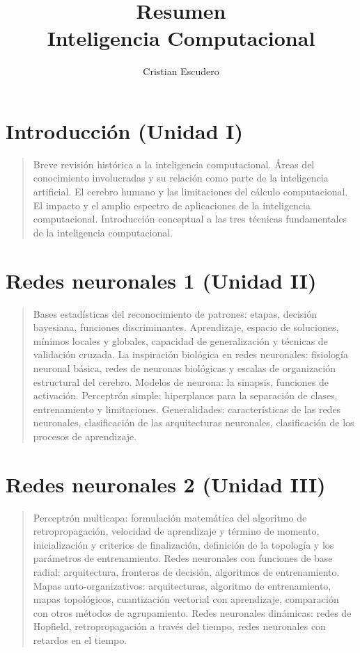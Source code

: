 \documentclass[10pt,a4paper]{article}
\author{Cristian Escudero}
\title{Resumen\\Inteligencia Computacional}
\begin{document}
\maketitle

\section*{Introducción (Unidad I)}
\begin{quote}
Breve revisión histórica a la inteligencia computacional. Áreas del conocimiento involucradas y su relación como parte de la inteligencia artificial. El cerebro humano y las limitaciones del cálculo computacional. El impacto y el amplio espectro de aplicaciones de la inteligencia computacional. Introducción conceptual a las tres técnicas fundamentales de la inteligencia computacional.
\end{quote}

\section*{Redes neuronales 1 (Unidad II)}
\begin{quote}
Bases estadísticas del reconocimiento de patrones: etapas, decisión bayesiana, funciones discriminantes. Aprendizaje, espacio de soluciones, mínimos locales y globales, capacidad de generalización y técnicas de validación cruzada. La inspiración biológica en redes neuronales: fisiología neuronal básica, redes de neuronas biológicas y escalas de organización estructural del cerebro. Modelos de neurona: la sinapsis, funciones de activación. Perceptrón simple: hiperplanos para la separación de clases, entrenamiento y limitaciones. Generalidades: características de las redes neuronales, clasificación de las arquitecturas neuronales, clasificación de los procesos de aprendizaje.
\end{quote}

\section*{Redes neuronales 2 (Unidad III)}
\begin{quote}
Perceptrón multicapa: formulación matemática del algoritmo de retropropagación, velocidad de aprendizaje y término de momento, inicialización y criterios de finalización, definición de la topología y los parámetros de entrenamiento. Redes neuronales con funciones de base radial: arquitectura, fronteras de decisión, algoritmos de entrenamiento. Mapas auto-organizativos: arquitecturas, algoritmo de entrenamiento, mapas topológicos, cuantización vectorial con aprendizaje, comparación con otros métodos de agrupamiento. Redes neuronales dinámicas: redes de Hopfield, retropropagación a través del tiempo, redes neuronales con retardos en el tiempo.
\end{quote}
\end{document}
